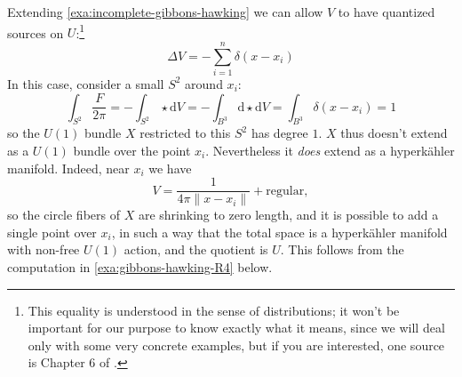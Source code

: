 \documentclass[12pt,letterpaper,reqno]{amsart}
\numberwithin{equation}{section}
\newcommand{\hk}{hyperk\"ahler\xspace}
\newcommand{\de}{\mathrm{d}}
\newcommand{\norm}[1]{\lVert#1\rVert}
\newcommand{\ti}[1]{\textit{#1}}
\begin{document}
\begin{example} \label{exa:gibbons-hawking}
Extending \autoref{exa:incomplete-gibbons-hawking}
we can allow $V$ to have quantized sources
on $U$:\footnote{This equality is understood in the sense 
of distributions; it won't be important for our purpose to 
know exactly what it means, since we will deal only with
some very concrete examples, but if you are interested,
one source is Chapter 6 of \cite{MR1817225}.}
\begin{equation}
  \Delta V = - \sum_{i=1}^n \delta(x - x_i)
\end{equation}
In this case, consider a small $S^2$ around $x_i$:
\begin{equation}
  \int_{S^2} \frac{F}{2\pi} = -\int_{S^2} \star \de V = -\int_{B^3} \de \star \de V = \int_{B^3} \delta(x - x_i) = 1
\end{equation}
so the $U(1)$ bundle $X$ restricted to this $S^2$ has 
degree $1$. $X$ thus doesn't extend as a $U(1)$ bundle
over the point $x_i$.
Nevertheless it \ti{does} extend as a \hk manifold.
Indeed, near $x_i$ we have
\begin{equation}
V = \frac{1}{4\pi\norm{x - x_i}} + \text{regular},
\end{equation}
so the circle fibers of $X$ are shrinking to zero
length, and it is possible to add
a single point over $x_i$, in such a way 
that the total space is a \hk manifold with non-free 
$U(1)$ action, and the quotient is $U$.
This follows from the computation in \autoref{exa:gibbons-hawking-R4}
below.
\end{example}
\end{document}
